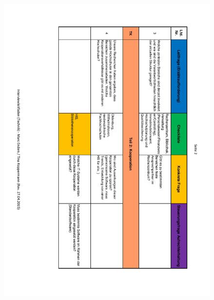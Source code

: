 \begin{figure}
	\centering
	\includegraphics[width=18cm]{kapitel/anhang/Interviewleitfaden_2}
\end{figure}

